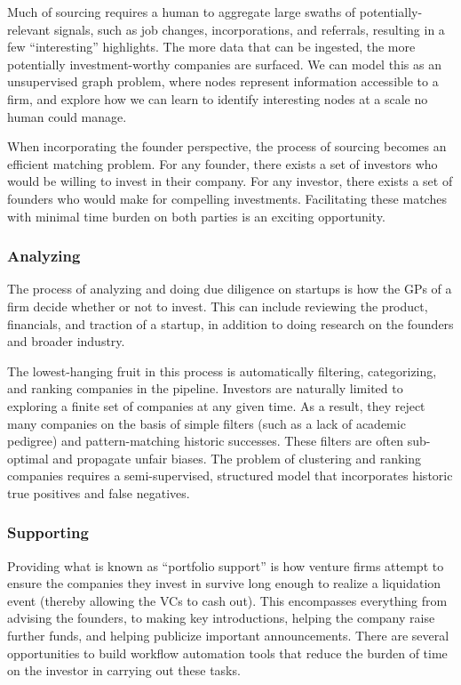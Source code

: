 Much of sourcing requires a human to aggregate large swaths of potentially-relevant signals, such as job changes, incorporations, and referrals, resulting in a few ``interesting'' highlights. The more data that can be ingested, the more potentially investment-worthy companies are surfaced. We can model this as an unsupervised graph problem, where nodes represent information accessible to a firm, and explore how we can learn to identify interesting nodes at a scale no human could manage.

When incorporating the founder perspective, the process of sourcing becomes an efficient matching problem. For any founder, there exists a set of investors who would be willing to invest in their company. For any investor, there exists a set of founders who would make for compelling investments. Facilitating these matches with minimal time burden on both parties is an exciting opportunity.

\subsubsection{Analyzing}

The process of analyzing and doing due diligence on startups is how the GPs of a firm decide whether or not to invest. This can include reviewing the product, financials, and traction of a startup, in addition to doing research on the founders and broader industry.

The lowest-hanging fruit in this process is automatically filtering, categorizing, and ranking companies in the pipeline. Investors are naturally limited to exploring a finite set of companies at any given time. As a result, they reject many companies on the basis of simple filters (such as a lack of academic pedigree) and pattern-matching historic successes. These filters are often sub-optimal and propagate unfair biases. The problem of clustering and ranking companies requires a semi-supervised, structured model that incorporates historic true positives and false negatives.

\subsubsection{Supporting}

Providing what is known as ``portfolio support'' is how venture firms attempt to ensure the companies they invest in survive long enough to realize a liquidation event (thereby allowing the VCs to cash out). This encompasses everything from advising the founders, to making key introductions, helping the company raise further funds, and helping publicize important announcements. There are several opportunities to build workflow automation tools that reduce the burden of time on the investor in carrying out these tasks.

